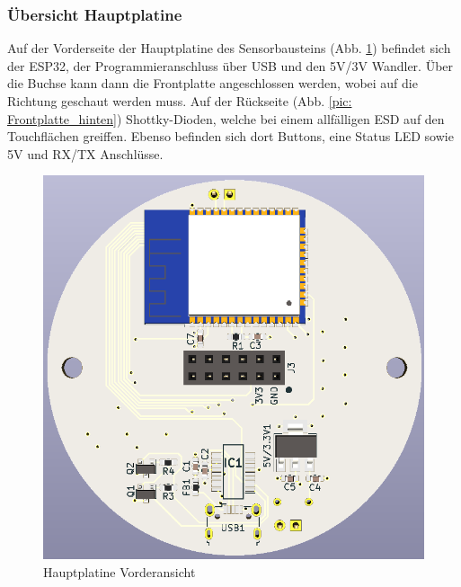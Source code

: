 \subsubsection{Übersicht Hauptplatine}
Auf der Vorderseite der Hauptplatine des Sensorbausteins (Abb. \ref{pic: Hauptplatine_vorne}) befindet sich der ESP32, der Programmieranschluss über USB und den 5V/3V Wandler. Über die Buchse kann dann die Frontplatte angeschlossen werden, wobei auf die Richtung geschaut werden muss. Auf der Rückseite (Abb. \ref{pic: Frontplatte_hinten}) Shottky-Dioden, welche bei einem allfälligen ESD auf den Touchflächen greiffen. Ebenso befinden sich dort Buttons, eine Status LED sowie 5V und RX/TX Anschlüsse. 

\begin{figure}[h!]
	\centering
	\begin{minipage}[t]{0.4\linewidth}
		\centering
		\includegraphics[width=1\textwidth]{graphics/Hauptplatine_vorne.png}
		\caption{Hauptplatine Vorderansicht}
		\label{pic: Hauptplatine_vorne}
	\end{minipage}%
	\hfill
	\begin{minipage}[t]{0.4\linewidth}
		\centering

\end{minipage}
\end{figure}
